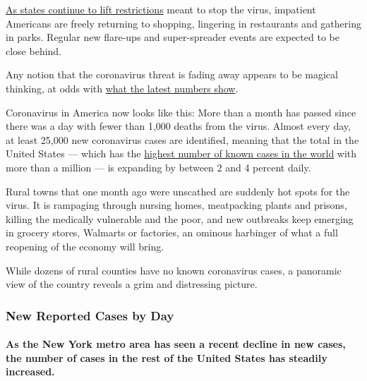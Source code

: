 \href{https://www.nytimes3xbfgragh.onion/interactive/2020/us/states-reopen-map-coronavirus.html}{As
states continue to lift restrictions} meant to stop the virus, impatient
Americans are freely returning to shopping, lingering in restaurants and
gathering in parks. Regular new flare-ups and super-spreader events are
expected to be close behind.

Any notion that the coronavirus threat is fading away appears to be
magical thinking, at odds with
\href{https://www.nytimes3xbfgragh.onion/interactive/2020/us/coronavirus-us-cases.html}{what
the latest numbers show}.

Coronavirus in America now looks like this: More than a month has passed
since there was a day with fewer than 1,000 deaths from the virus.
Almost every day, at least 25,000 new coronavirus cases are identified,
meaning that the total in the United States --- which has the
\href{https://www.nytimes3xbfgragh.onion/interactive/2020/world/coronavirus-maps.html}{highest
number of known cases in the world} with more than a million --- is
expanding by between 2 and 4 percent daily.

Rural towns that one month ago were unscathed are suddenly hot spots for
the virus. It is rampaging through nursing homes, meatpacking plants and
prisons, killing the medically vulnerable and the poor, and new
outbreaks keep emerging in grocery stores, Walmarts or factories, an
ominous harbinger of what a full reopening of the economy will bring.

While dozens of rural counties have no known coronavirus cases, a
panoramic view of the country reveals a grim and distressing picture.

\hypertarget{new-reported-cases-by-day}{%
\subsubsection{New Reported Cases by
Day}\label{new-reported-cases-by-day}}

\hypertarget{as-the-new-york-metro-area-has-seen-a-recent-decline-in-new-cases-the-number-of-cases-in-the-rest-of-the-united-states-has-steadily-increased}{%
\paragraph{As the New York metro area has seen a recent decline in new
cases, the number of cases in the rest of the United States has steadily
increased.}\label{as-the-new-york-metro-area-has-seen-a-recent-decline-in-new-cases-the-number-of-cases-in-the-rest-of-the-united-states-has-steadily-increased}}

